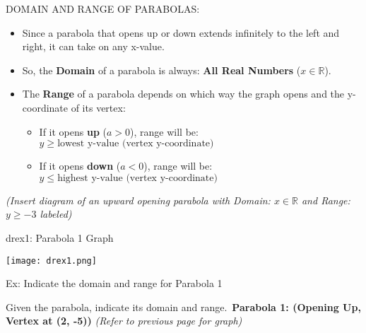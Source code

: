 \documentclass[aspectratio=169]{beamer}
\begin{document}
\begin{frame}{DOMAIN AND RANGE OF PARABOLAS:}
    \begin{tcolorbox}[colback=lightgray,colframe=primary,title=Key Rules for Parabolas]
        \footnotesize
        \begin{itemize}
            \item Since a parabola that opens up or down extends infinitely to the left and right, it can take on any x-value.
            \item So, the \textbf{Domain} of a parabola is always: \textbf{All Real Numbers} ($x \in \mathbb{R}$).
            \item The \textbf{Range} of a parabola depends on which way the graph opens and the y-coordinate of its vertex:
            \begin{itemize}
                \item If it opens \textbf{up} ($a > 0$), range will be: $y \ge \text{lowest y-value (vertex y-coordinate)}$
                \item If it opens \textbf{down} ($a < 0$), range will be: $y \le \text{highest y-value (vertex y-coordinate)}$
            \end{itemize}
        \end{itemize}
        \vspace{0.5em}
        \textit{(Insert diagram of an upward opening parabola with Domain: $x \in \mathbb{R}$ and Range: $y \ge -3$ labeled)}
    \end{tcolorbox}
\end{frame}

\begin{frame}{drex1: Parabola 1 Graph}
    \begin{tcolorbox}[colback=lightgray,colframe=primary,title=Visual Representation]
        \centering
        \texttt{[image: drex1.png]}
    \end{tcolorbox}
\end{frame}

\begin{frame}{Ex: Indicate the domain and range for Parabola 1}
    \begin{tcolorbox}[colback=lightgray,colframe=primary,title=Problem]
        \footnotesize
        Given the parabola, indicate its domain and range.\
        \textbf{Parabola 1: (Opening Up, Vertex at (2, -5))}
        \textit{(Refer to previous page for graph)}
    \end{tcolorbox}
\end{frame}
\end{document}
